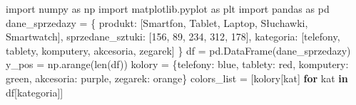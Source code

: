 \documentclass[
  polish,
  letterpaper,
  DIV=11,
  numbers=noendperiod]{scrreprt}
\newenvironment{Shaded}{\begin{snugshade}}{\end{snugshade}}
\newcommand{\BuiltInTok}[1]{\textcolor[rgb]{0.00,0.23,0.31}{#1}}
\newcommand{\ControlFlowTok}[1]{\textcolor[rgb]{0.00,0.23,0.31}{\textbf{#1}}}
\newcommand{\DecValTok}[1]{\textcolor[rgb]{0.68,0.00,0.00}{#1}}
\newcommand{\ImportTok}[1]{\textcolor[rgb]{0.00,0.46,0.62}{#1}}
\newcommand{\KeywordTok}[1]{\textcolor[rgb]{0.00,0.23,0.31}{\textbf{#1}}}
\newcommand{\NormalTok}[1]{\textcolor[rgb]{0.00,0.23,0.31}{#1}}
\newcommand{\OperatorTok}[1]{\textcolor[rgb]{0.37,0.37,0.37}{#1}}
\newcommand{\StringTok}[1]{\textcolor[rgb]{0.13,0.47,0.30}{#1}}
\begin{document}
\begin{Shaded}
\begin{Highlighting}[]
\ImportTok{import}\NormalTok{ numpy }\ImportTok{as}\NormalTok{ np}
\ImportTok{import}\NormalTok{ matplotlib.pyplot }\ImportTok{as}\NormalTok{ plt}
\ImportTok{import}\NormalTok{ pandas }\ImportTok{as}\NormalTok{ pd}
\NormalTok{dane\_sprzedazy }\OperatorTok{=}\NormalTok{ \{}
    \StringTok{\textquotesingle{}produkt\textquotesingle{}}\NormalTok{: [}\StringTok{\textquotesingle{}Smartfon\textquotesingle{}}\NormalTok{, }\StringTok{\textquotesingle{}Tablet\textquotesingle{}}\NormalTok{, }\StringTok{\textquotesingle{}Laptop\textquotesingle{}}\NormalTok{, }\StringTok{\textquotesingle{}Słuchawki\textquotesingle{}}\NormalTok{, }\StringTok{\textquotesingle{}Smartwatch\textquotesingle{}}\NormalTok{],}
    \StringTok{\textquotesingle{}sprzedane\_sztuki\textquotesingle{}}\NormalTok{: [}\DecValTok{156}\NormalTok{, }\DecValTok{89}\NormalTok{, }\DecValTok{234}\NormalTok{, }\DecValTok{312}\NormalTok{, }\DecValTok{178}\NormalTok{],}
    \StringTok{\textquotesingle{}kategoria\textquotesingle{}}\NormalTok{: [}\StringTok{\textquotesingle{}telefony\textquotesingle{}}\NormalTok{, }\StringTok{\textquotesingle{}tablety\textquotesingle{}}\NormalTok{, }\StringTok{\textquotesingle{}komputery\textquotesingle{}}\NormalTok{, }\StringTok{\textquotesingle{}akcesoria\textquotesingle{}}\NormalTok{, }\StringTok{\textquotesingle{}zegarek\textquotesingle{}}\NormalTok{]}
\NormalTok{\}}
\NormalTok{df }\OperatorTok{=}\NormalTok{ pd.DataFrame(dane\_sprzedazy)}
\NormalTok{y\_pos }\OperatorTok{=}\NormalTok{ np.arange(}\BuiltInTok{len}\NormalTok{(df))}
\NormalTok{kolory }\OperatorTok{=}\NormalTok{ \{}\StringTok{\textquotesingle{}telefony\textquotesingle{}}\NormalTok{: }\StringTok{\textquotesingle{}blue\textquotesingle{}}\NormalTok{, }\StringTok{\textquotesingle{}tablety\textquotesingle{}}\NormalTok{: }\StringTok{\textquotesingle{}red\textquotesingle{}}\NormalTok{, }\StringTok{\textquotesingle{}komputery\textquotesingle{}}\NormalTok{: }\StringTok{\textquotesingle{}green\textquotesingle{}}\NormalTok{, }
          \StringTok{\textquotesingle{}akcesoria\textquotesingle{}}\NormalTok{: }\StringTok{\textquotesingle{}purple\textquotesingle{}}\NormalTok{, }\StringTok{\textquotesingle{}zegarek\textquotesingle{}}\NormalTok{: }\StringTok{\textquotesingle{}orange\textquotesingle{}}\NormalTok{\}}
\NormalTok{colors\_list }\OperatorTok{=}\NormalTok{ [kolory[kat] }\ControlFlowTok{for}\NormalTok{ kat }\KeywordTok{in}\NormalTok{ df[}\StringTok{\textquotesingle{}kategoria\textquotesingle{}}\NormalTok{]]}

\end{Highlighting}
\end{Shaded}
\end{document}
